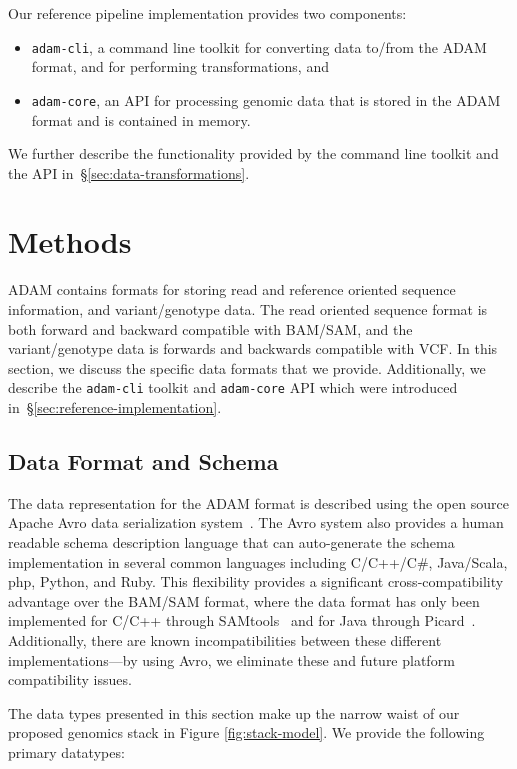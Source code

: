 \documentclass{bioinfo}
\begin{document}
Our reference pipeline implementation provides two components:

\begin{itemize}
\item \texttt{adam-cli}, a command line toolkit for converting data to/from the ADAM format, and for performing transformations, and
\item \texttt{adam-core}, an API for processing genomic data that is stored in the ADAM format and is contained in memory.
\end{itemize}

\noindent We further describe the functionality provided by the command line toolkit and the API in~\S\ref{sec:data-transformations}.

\section{Methods}
\label{sec:methods}

ADAM contains formats for storing read and reference oriented sequence information, and variant/genotype data. The read oriented sequence format is both forward and
backward compatible with BAM/SAM, and the variant/genotype data is forwards and backwards compatible with VCF. In this section, we discuss the specific data formats
that we provide. Additionally, we describe the \texttt{adam-cli} toolkit and \texttt{adam-core} API which were introduced in~\S\ref{sec:reference-implementation}.

\subsection{Data Format and Schema}
\label{sec:data-format-and-schema}

The data representation for the ADAM format is described using the open source Apache Avro data serialization system~\citep{avro}. The Avro system also provides a human
readable schema description language that can auto-generate the schema implementation in several common languages including C/C++/C\#, Java/Scala, php, Python, and
Ruby. This flexibility provides a significant cross-compatibility advantage over the BAM/SAM format, where the data format has only been implemented for C/C++ through
SAMtools~\citep{li09} and for Java through Picard~\citep{picard}. Additionally, there are known incompatibilities between these different implementations---by using Avro,
we eliminate these and future platform compatibility issues.

The data types presented in this section make up the narrow waist of our proposed genomics stack in Figure \ref{fig:stack-model}. We provide the following primary datatypes:
\end{document}
